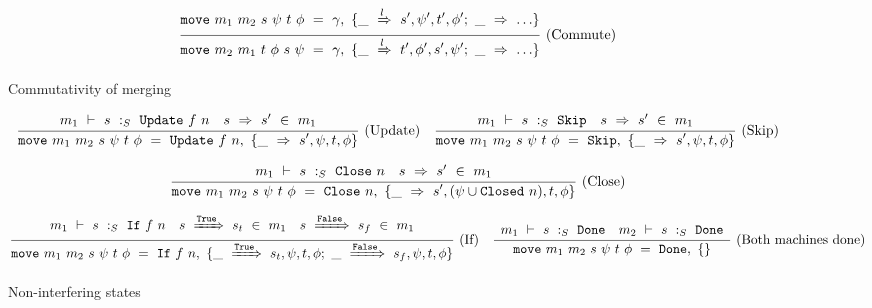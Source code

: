 
\begin{figure*}

$$
\frac {\displaystyle 
    \mathtt{move}~m_1~m_2~s~\psi~t~\phi~=~\gamma,~\{\_~\xRightarrow{l}~s',\psi',t',\phi';~ \_~\Rightarrow~\ldots \}
} {\displaystyle 
    \mathtt{move}~m_2~m_1~t~\phi~s~\psi
    ~=~\gamma,~\{\_~\xRightarrow{l}~t',\phi',s',\psi';~ \_~\Rightarrow~\ldots \}
} \ 
\textrm{(Commute)}
$$

\caption{Commutativity of merging}
\label{fig:merge:gen:comm}
\end{figure*}

\begin{figure*}


$$
\frac {\displaystyle 
    \begin{array}{lr}  m_1 ~\vdash~ s ~:_S~ \mathtt{Update}~f~n  &  s ~\Rightarrow~ s' ~\in~m_1  \end{array}
} {\displaystyle 
    \mathtt{move}~m_1~m_2~s~\psi~t~\phi~=~\mathtt{Update}~f~n,~\{\_~\Rightarrow~s',\psi,t,\phi\}
} \ 
\textrm{(Update)}
\quad
\frac {\displaystyle 
    \begin{array}{lr}  m_1 ~\vdash~ s ~:_S~ \mathtt{Skip}  &  s ~\Rightarrow~ s' ~\in~m_1  \end{array}
} {\displaystyle 
    \mathtt{move}~m_1~m_2~s~\psi~t~\phi~=~\mathtt{Skip},~\{\_~\Rightarrow~s',\psi,t,\phi\}
} \ 
\textrm{(Skip)}
$$

$$
\frac {\displaystyle 
    \begin{array}{lr}  m_1 ~\vdash~ s ~:_S~ \mathtt{Close}~n  &  s ~\Rightarrow~ s' ~\in~m_1  \end{array}
} {\displaystyle 
    \mathtt{move}~m_1~m_2~s~\psi~t~\phi~=~\mathtt{Close}~n,~\{\_~\Rightarrow~s',(\psi \cup \mathtt{Closed}~n), t, \phi\}
} \ 
\textrm{(Close)}
$$

$$
\frac {\displaystyle 
    \begin{array}{lcr}  m_1 ~\vdash~ s ~:_S~ \mathtt{If}~f~n  &  s ~\xRightarrow{\mathtt{True}}~ s_t ~\in~m_1  &  s ~\xRightarrow{\mathtt{False}}~ s_f ~\in~m_1  \end{array}
} {\displaystyle 
    \mathtt{move}~m_1~m_2~s~\psi~t~\phi~=~\mathtt{If}~f~n,~\{ \_~\xRightarrow{\mathtt{True}}~s_t,\psi,t,\phi
         ;~
          \_~\xRightarrow{\mathtt{False}}~s_f,\psi,t,\phi
        \}
} \ 
\textrm{(If)}
\quad
\frac {\displaystyle 
    \begin{array}{lr}  m_1 ~\vdash~ s ~:_S~ \mathtt{Done}  &  m_2 ~\vdash~ s ~:_S~ \mathtt{Done}  \end{array}
} {\displaystyle 
    \mathtt{move}~m_1~m_2~s~\psi~t~\phi~=~\mathtt{Done},~\{\}
} \ 
\textrm{(Both machines done)}
$$

\caption{Non-interfering states}
\label{fig:merge:gen:noninter}
\end{figure*}

